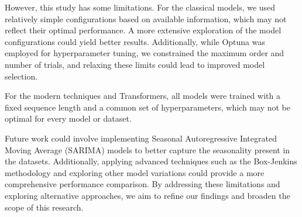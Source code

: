 \documentclass[sn-mathphys-num]{sn-jnl}
\theoremstyle{thmstyleone}%
\theoremstyle{thmstyletwo}%
\theoremstyle{thmstylethree}%
\begin{document}
However, this study has some limitations. For the classical models, we used relatively simple configurations based on available information, which may not reflect their optimal performance. A more extensive exploration of the model configurations could yield better results. Additionally, while Optuna was employed for hyperparameter tuning, we constrained the maximum order and number of trials, and relaxing these limits could lead to improved model selection.

For the modern techniques and Transformers, all models were trained with a fixed sequence length and a common set of hyperparameters, which may not be optimal for every model or dataset.

Future work could involve implementing Seasonal Autoregressive Integrated Moving Average (SARIMA) \cite{box2015time} models to better capture the seasonality present in the datasets. Additionally, applying advanced techniques such as the Box-Jenkins \cite{box2015time} methodology and exploring other model variations could provide a more comprehensive performance comparison. By addressing these limitations and exploring alternative approaches, we aim to refine our findings and broaden the scope of this research.





\end{document}

